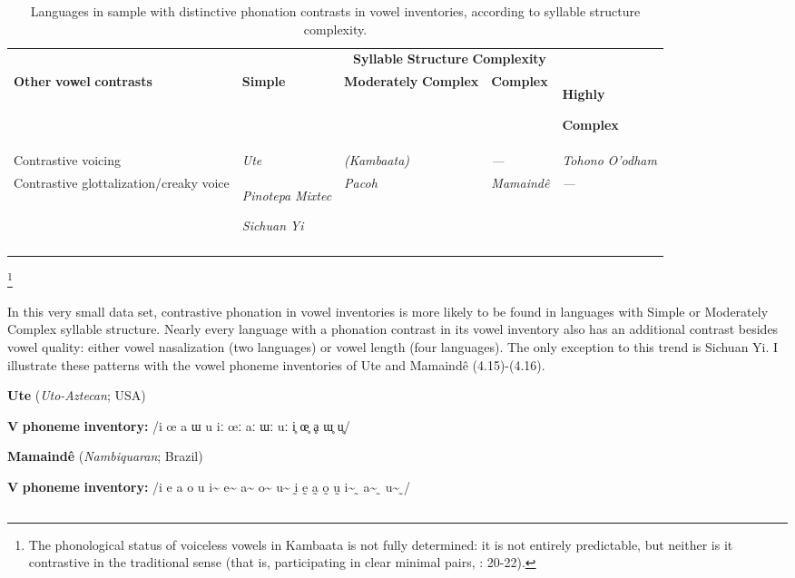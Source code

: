 \begin{table}
\begin{tabularx}{\textwidth}{XXXXX}
 & \multicolumn{4}{c}{ \textbf{Syllable} \textbf{Structure} \textbf{Complexity}}\\
\lsptoprule
\textbf{Other} \textbf{vowel} \textbf{contrasts} & \textbf{Simple} & \textbf{Moderately} \textbf{Complex} & \textbf{Complex} & { \textbf{Highly} }

 \textbf{Complex}\\
Contrastive voicing & \textit{Ute} & \textit{(Kambaata)} & \textit{—} & \textit{Tohono} \textit{O’odham}\\
Contrastive glottalization/creaky voice & { \textit{Pinotepa} \textit{Mixtec}}

 \textit{Sichuan} \textit{Yi} & \textit{Pacoh} & \textit{Mamaindê} & \textit{—}\\
\lspbottomrule
\end{tabularx}
\caption{\label{4.5}Languages in sample with distinctive phonation contrasts in vowel inventories, according to syllable structure complexity.}
\footnote{ \textrm{The phonological status of voiceless vowels in Kambaata is not fully determined: it is not entirely predictable, but neither is it contrastive in the traditional sense (that is, participating in clear minimal pairs, \citealt{Treis2008}: 20-22).}}
\end{table}

  In this very small data set, contrastive phonation in vowel inventories is more likely to be found in languages with Simple or Moderately Complex syllable structure. Nearly every language with a phonation contrast in its vowel inventory also has an additional contrast besides vowel quality: either vowel nasalization (two languages) or vowel length (four languages). The only exception to this trend is Sichuan Yi. I illustrate these patterns with the vowel phoneme inventories of Ute and Mamaindê (4.15)-(4.16).

\ea\label{ex:(4.15)}
  \textbf{Ute} (\textit{Uto-Aztecan}; USA)

\textbf{V} \textbf{phoneme} \textbf{inventory:} /i œ a ɯ u iː œː aː ɯː uː i̥ œ̥ ḁ ɯ̥ u̥/
\z

\ea\label{ex:(4.16)}
  \textbf{Mamaindê} (\textit{Nambiquaran}; Brazil)

\textbf{V} \textbf{phoneme} \textbf{inventory:} /i e a o u i\~{}  e\~{}  a\~{}  o\~{}  u\~{}  ḭ ḛ a̰ o̰ ṵ i\~{} ̰ a\~{} ̰ u\~{} ̰/
\z

\subsection{\rmfamily} 
